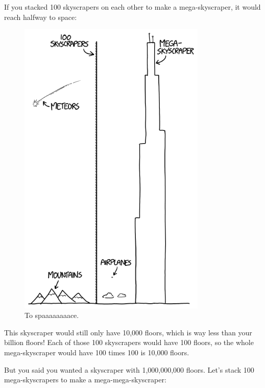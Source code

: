 {{If you stacked 100 skyscrapers on each other to make a mega-skyscraper, it would reach halfway to space:}

\begin{figure}[!htbp]
\centering
\includegraphics[scale=0.5, max width=0.8\textwidth]{imgs/a/94/billion_100x100.png}
\caption{To spaaaaaaaace.}
\end{figure}

{This skyscraper would still only have 10,000 floors, which is way less than your billion floors! Each of those 100 skyscrapers would have 100 floors, so the whole mega-skyscraper would have 100 times 100 is 10,000 floors.}

{But you said you wanted a skyscraper with 1,000,000,000 floors. Let's stack 100 mega-skyscrapers to make a mega-mega-skyscraper:}

}
